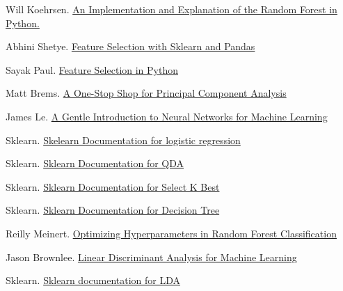 \documentclass{article}
\begin{document}
\begin{thebibliography}{1}

Will Koehrsen.
\newblock\href{https://towardsdatascience.com/an-implementation-and-explanation-of-the-random-forest-in-python-77bf308a9b76}{ An Implementation and Explanation of the Random Forest in Python.}

Abhini Shetye.
\newblock\href{https://towardsdatascience.com/feature-selection-with-pandas-e3690ad8504b}{Feature Selection with Sklearn and Pandas}

Sayak Paul.
\newblock\href{https://www.datacamp.com/community/tutorials/feature-selection-python}{Feature Selection in Python}

Matt Brems.
\newblock\href{https://towardsdatascience.com/a-one-stop-shop-for-principal-component-analysis-5582fb7e0a9c}{A One-Stop Shop for Principal Component Analysis}

James Le.
\newblock\href{https://www.codementor.io/@james_aka_yale/a-gentle-introduction-to-neural-networks-for-machine-learning-hkijvz7lp}{A Gentle Introduction to Neural Networks for Machine Learning}

Sklearn.
\newblock\href{https://scikit-learn.org/stable/modules/generated/sklearn.linear_model.LogisticRegression.html}{Skelearn Documentation for logistic regression}

Sklearn.
\newblock\href{https://scikit-learn.org/0.16/modules/generated/sklearn.qda.QDA.html}{Sklearn Documentation for QDA}

Sklearn.
\newblock\href{https://scikit-learn.org/stable/modules/generated/sklearn.feature_selection.SelectKBest.html}{Sklearn Documentation for Select K Best}

Sklearn.
\newblock\href{https://scikit-learn.org/stable/auto_examples/tree/plot_tree_regression.html}{Sklearn Documentation for Decision Tree}

Reilly Meinert.
\newblock\href{https://towardsdatascience.com/optimizing-hyperparameters-in-random-forest-classification-ec7741f9d3f6}{Optimizing Hyperparameters in Random Forest Classification}

Jason Brownlee.
\newblock\href{https://machinelearningmastery.com/linear-discriminant-analysis-for-machine-learning/}{Linear Discriminant Analysis for Machine Learning}

Sklearn.
\newblock\href{https://scikit-learn.org/stable/modules/generated/sklearn.discriminant_analysis.LinearDiscriminantAnalysis.html}{Sklearn documentation for LDA}


\end{thebibliography}
\end{document}

